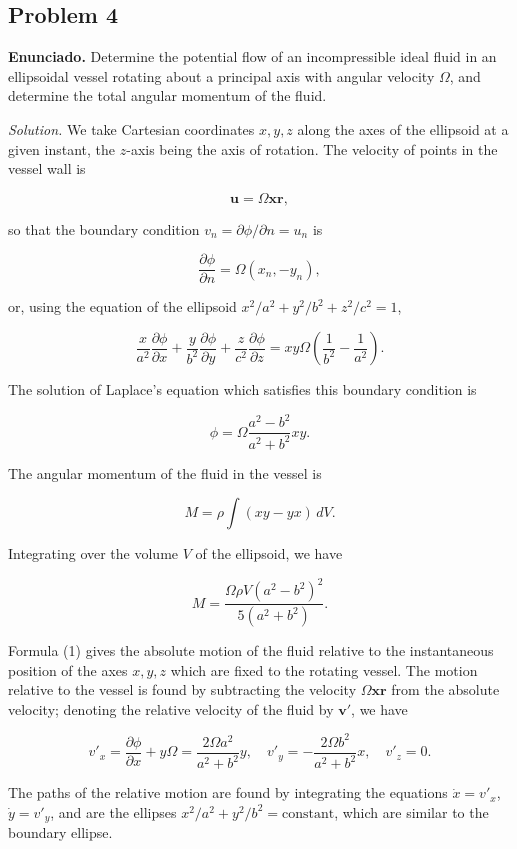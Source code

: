 \documentclass{article}
\begin{document}
\subsection*{Problem 4}

\textbf{Enunciado.} Determine the potential flow of an incompressible ideal fluid in an ellipsoidal vessel rotating about a principal axis with angular velocity $\Omega$, and determine the total angular momentum of the fluid.

\textit{Solution.} We take Cartesian coordinates $x, y, z$ along the axes of the ellipsoid at a given instant, the $z$-axis being the axis of rotation. The velocity of points in the vessel wall is

$$
\mathbf{u} = \Omega \mathbf{x} \mathbf{r},
$$

so that the boundary condition $v_n = \partial \phi/\partial n = u_n$ is

$$
\frac{\partial \phi}{\partial n} = \Omega (x_n, -y_n),
$$

or, using the equation of the ellipsoid $x^2/a^2 + y^2/b^2 + z^2/c^2 = 1$,

$$
\frac{x}{a^2} \frac{\partial \phi}{\partial x} + \frac{y}{b^2} \frac{\partial \phi}{\partial y} + \frac{z}{c^2} \frac{\partial \phi}{\partial z} = xy \Omega \left( \frac{1}{b^2} - \frac{1}{a^2} \right).
$$

The solution of Laplace's equation which satisfies this boundary condition is

$$
\phi = \Omega \frac{a^2 - b^2}{a^2 + b^2} xy. \tag{1}
$$

The angular momentum of the fluid in the vessel is

$$
M = \rho \int (xy - yx) \, dV.
$$

Integrating over the volume $V$ of the ellipsoid, we have

$$
M = \frac{\Omega \rho V (a^2 - b^2)^2}{5(a^2 + b^2)}.
$$

Formula (1) gives the absolute motion of the fluid relative to the instantaneous position of the axes $x, y, z$ which are fixed to the rotating vessel. The motion relative to the vessel is found by subtracting the velocity $\Omega \mathbf{x} \mathbf{r}$ from the absolute velocity; denoting the relative velocity of the fluid by $\mathbf{v}'$, we have

$$
v'_x = \frac{\partial \phi}{\partial x} + y \Omega = \frac{2 \Omega a^2}{a^2 + b^2} y, \quad v'_y = -\frac{2 \Omega b^2}{a^2 + b^2} x, \quad v'_z = 0.
$$

The paths of the relative motion are found by integrating the equations $\dot{x} = v'_x$, $\dot{y} = v'_y$, and are the ellipses $x^2/a^2 + y^2/b^2 = \text{constant}$, which are similar to the boundary ellipse.
\end{document}

